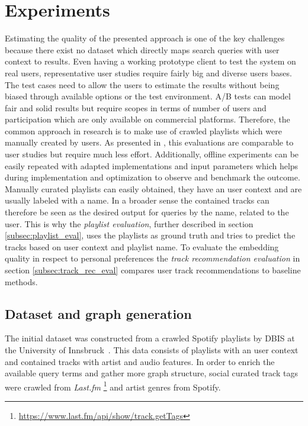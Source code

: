 \documentclass[sigconf]{acmart}
\begin{document}
\section{Experiments}
Estimating the quality of the presented approach is one of the key challenges because there exist no dataset which directly maps search queries with user context to results. Even having a working prototype client to test the system on real users, representative user studies require fairly big and diverse users bases. The test cases need to allow the users to estimate the results without being biased through available options or the test environment. A/B tests can model fair and solid results but require scopes in terms of number of users and participation which are only available on commercial platforms. Therefore, the common approach in research is to make use of crawled playlists which were manually created by users. As presented in \cite{kamehkhosh2017user}, this evaluations are comparable to user studies but require much less effort. Additionally, offline experiments can be easily repeated with adapted implementations and input parameters which helps during implementation and optimization to observe and benchmark the outcome. \\

Manually curated playlists can easily obtained, they have an user context and are usually labeled with a name. In a broader sense the contained tracks can therefore be seen as the desired output for queries by the name, related to the user. This is why the \emph{playlist evaluation}, further described in section \ref{subsec:playlist_eval}, uses the playlists as ground truth and tries to predict the tracks based on user context and playlist name. To evaluate the embedding quality in respect to personal preferences the \emph{track recommendation evaluation} in section \ref{subsec:track_rec_eval} compares user track recommendations to baseline methods.


\subsection{Dataset and graph generation}
The initial dataset was constructed from a crawled Spotify playlists by DBIS at the University of Innsbruck~\cite{pichl2017improving}. This data consists of playlists with an user context and contained tracks with artist and audio features. In order to enrich the available query terms and gather more graph structure, social curated track tags were crawled from \emph{Last.fm} \footnote{\url{https://www.last.fm/api/show/track.getTags}} and artist genres from Spotify.
\end{document}
